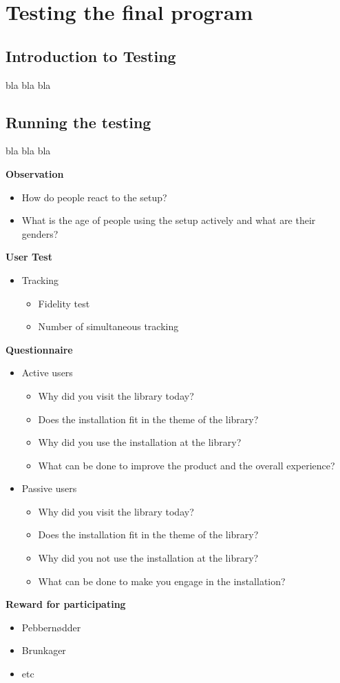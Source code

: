 \chapter{Testing the final program}
\section{Introduction to Testing}
bla bla bla
\section{Running the testing}
bla bla bla

\textbf{Observation}
\begin{itemize}
\item How do people react to the setup?	
\item What is the age of people using the setup actively and what are their genders?
\end{itemize}

\textbf{User Test}
\begin{itemize}
\item Tracking
\begin{itemize}
\item Fidelity test
\item Number of simultaneous tracking
\end{itemize}
\end{itemize}

\textbf{Questionnaire}
\begin{itemize}
\item Active users
\begin{itemize}
\item Why did you visit the library today?
\item Does the installation fit in the theme of the library?
\item Why did you use the installation at the library?
\item What can be done to improve the product and the overall experience?
\end{itemize}
\item Passive users
\begin{itemize}
\item Why did you visit the library today?
\item Does the installation fit in the theme of the library?
\item Why did you not use the installation at the library?
\item What can be done to make you engage in the installation?
\end{itemize}
\end{itemize}
\textbf{Reward for participating}
\begin{itemize}
\item Pebbern{\o}dder
\item Brunkager
\item etc
\end{itemize}
